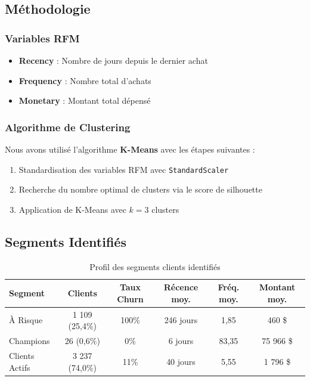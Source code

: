 \documentclass[11pt,a4paper]{article}
\begin{document}
\subsection{Méthodologie}

\subsubsection{Variables RFM}
\begin{itemize}
    \item \textbf{Recency} : Nombre de jours depuis le dernier achat
    \item \textbf{Frequency} : Nombre total d'achats
    \item \textbf{Monetary} : Montant total dépensé
\end{itemize}

\subsubsection{Algorithme de Clustering}
Nous avons utilisé l'algorithme \textbf{K-Means} avec les étapes suivantes :
\begin{enumerate}
    \item Standardisation des variables RFM avec \texttt{StandardScaler}
    \item Recherche du nombre optimal de clusters via le score de silhouette
    \item Application de K-Means avec $k=3$ clusters
\end{enumerate}

\subsection{Segments Identifiés}

\begin{table}[H]
\centering
\begin{tabular}{L{3cm}ccccc}
\toprule
\textbf{Segment} & \textbf{Clients} & \textbf{Taux Churn} & \textbf{Récence moy.} & \textbf{Fréq. moy.} & \textbf{Montant moy.} \\
\midrule
À Risque & 1 109 (25,4\%) & 100\% & 246 jours & 1,85 & 460 \$ \\
Champions & 26 (0,6\%) & 0\% & 6 jours & 83,35 & 75 966 \$ \\
Clients Actifs & 3 237 (74,0\%) & 11\% & 40 jours & 5,55 & 1 796 \$ \\
\bottomrule
\end{tabular}
\caption{Profil des segments clients identifiés}
\end{table}
\end{document}
